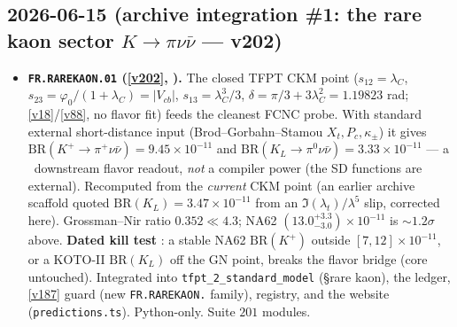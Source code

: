 \subsection*{2026-06-15 (archive integration \#1: the rare kaon sector $K\to\pi\nu\bar\nu$ --- v202)}
\begin{itemize}
\item \textbf{\texttt{FR.RAREKAON.01} (\vref{v202}, \mC).} The closed TFPT CKM point ($s_{12}{=}\lambda_C$,
  $s_{23}{=}\varphi_0/(1{+}\lambda_C){=}|V_{cb}|$, $s_{13}{=}\lambda_C^3/3$, $\delta{=}\pi/3{+}3\lambda_C^2{=}1.19823$
  rad; \vref{v18}/\vref{v88}, no flavor fit) feeds the cleanest FCNC probe. With standard external
  short-distance input (Brod--Gorbahn--Stamou $X_t,P_c,\kappa_\pm$) it gives
  $\mathrm{BR}(K^+\!\to\pi^+\nu\bar\nu)=9.45\times10^{-11}$ and $\mathrm{BR}(K_L\to\pi^0\nu\bar\nu)=3.33\times10^{-11}$
  --- a \mC\ downstream flavor readout, \emph{not} a compiler power (the SD functions are external). Recomputed
  from the \emph{current} CKM point (an earlier archive scaffold quoted $\mathrm{BR}(K_L)=3.47\times10^{-11}$
  from an $\Im(\lambda_t)/\lambda^5$ slip, corrected here). Grossman--Nir ratio $0.352\ll4.3$; NA62
  $(13.0^{+3.3}_{-3.0})\times10^{-11}$ is $\sim1.2\sigma$ above. \textbf{Dated kill test \mX}: a stable NA62
  $\mathrm{BR}(K^+)$ outside $[7,12]\times10^{-11}$, or a KOTO-II $\mathrm{BR}(K_L)$ off the GN point, breaks the
  flavor bridge (core untouched). Integrated into \texttt{tfpt\_2\_standard\_model} (\S rare kaon), the ledger,
  \vref{v187} guard (new \texttt{FR.RAREKAON.} family), registry, and the website (\texttt{predictions.ts}).
  Python-only. Suite $201$ modules.
\end{itemize}

